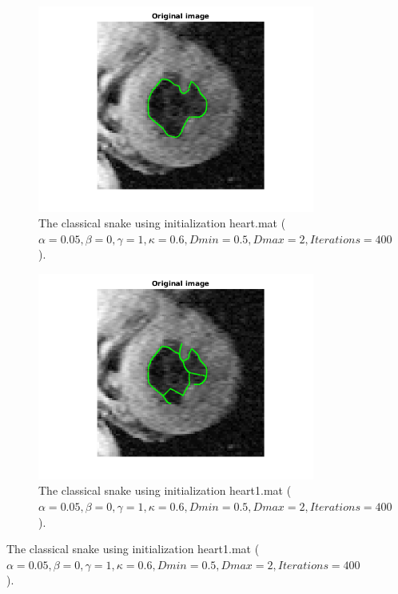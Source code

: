 \documentclass{article}
\begin{document}
\begin{figure}[h!]
\centering
\begin{subfigure}{0.49\textwidth}
  \centering
  \includegraphics[width=\linewidth]{fig8a.png}
  \caption{The classical snake using initialization heart.mat ($\alpha=0.05, \beta=0, \gamma=1,\kappa=0.6,Dmin=0.5,Dmax=2, Iterations=400$).}
  \label{fig8a}
\end{subfigure}
\begin{subfigure}{0.49\textwidth}
  \centering
  \includegraphics[width=\linewidth]{fig8b.png}
  \caption{The classical snake using initialization heart1.mat ($\alpha=0.05, \beta=0, \gamma=1,\kappa=0.6,Dmin=0.5,Dmax=2, Iterations=400$).}
  \label{fig8b}
\end{subfigure}

\end{figure}
\end{document}
